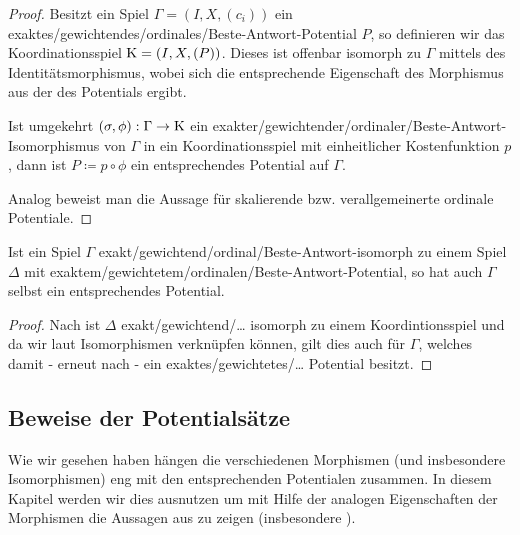 \begin{proof}
	Besitzt ein Spiel $\Gamma= (I, X, (c_i))$ ein exaktes/gewichtendes/ordinales/Beste-Antwort-Potential $P$, so definieren wir das Koordinationsspiel $\mathrm{K} = (I, X, (P))$. Dieses ist offenbar isomorph zu $\Gamma$ mittels des Identitätsmorphismus, wobei sich die entsprechende Eigenschaft des Morphismus aus der des Potentials ergibt.
	
	Ist umgekehrt $(\sigma, \phi): \Gamma \to \mathrm{K}$ ein exakter/gewichtender/ordinaler/Beste-Antwort-Isomorphismus von $\Gamma$ in ein Koordinationsspiel mit einheitlicher Kostenfunktion $p$, dann ist $P \coloneqq p \circ \phi$ ein entsprechendes Potential auf $\Gamma$.
	
	Analog beweist man die Aussage für skalierende bzw. verallgemeinerte ordinale Potentiale.
\end{proof}

\begin{kor}\label{kor:PotentialeDurchIsosUebertragen}
	Ist ein Spiel $\Gamma$ exakt/gewichtend/ordinal/Beste-Antwort-isomorph zu einem Spiel $\Delta$ mit exaktem/gewichtetem/ordinalen/Beste-Antwort-Potential, so hat auch $\Gamma$ selbst ein entsprechendes Potential.
\end{kor}

\begin{proof}
	Nach  ist $\Delta$ exakt/gewichtend/\dots{} isomorph zu einem Koordintionsspiel und da wir laut  Isomorphismen verknüpfen können, gilt dies auch für $\Gamma$, welches damit - erneut nach  - ein exaktes/gewichtetes/\dots{} Potential besitzt.
\end{proof}


\subsection{Beweise der Potentialsätze}\label{sec:Morphismen:Potentialsaetze}

Wie wir gesehen haben hängen die verschiedenen Morphismen (und insbesondere Isomorphismen) eng mit den entsprechenden Potentialen zusammen. In diesem Kapitel werden wir dies ausnutzen um mit Hilfe der analogen Eigenschaften der Morphismen die Aussagen aus  zu zeigen (insbesondere ).

